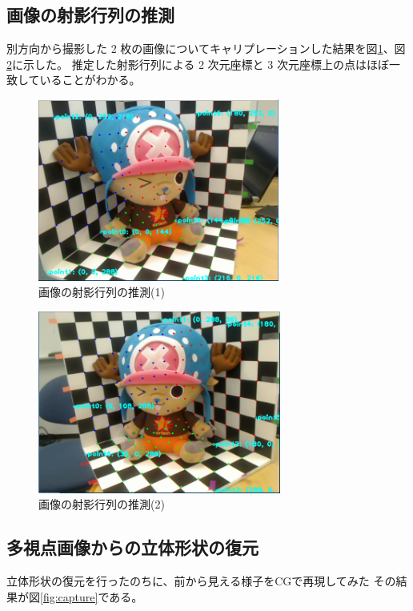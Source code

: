 \documentclass[11pt,a4j]{jsarticle}
\makeatletter
\newcommand{\figcaption}[1]{\def\@captype{figure}\caption{#1}}
\makeatother
\begin{document}
\subsection{画像の射影行列の推測}
\label{sub:result_syaei}

別方向から撮影した 2 枚の画像についてキャリプレーションした結果を図\ref{fig:input0}、図\ref{fig:input1}に示した。
推定した射影行列による 2 次元座標と 3 次元座標上の点はほぼ一致していることがわかる。

\begin{figure}[H]
  \centering
  \includegraphics[height=60mm,bb=0 0 642 486]{image/input0.png}
  \figcaption{画像の射影行列の推測(1)}
  \label{fig:input0}
\end{figure}

\begin{figure}[H]
  \centering
  \includegraphics[height=60mm,bb=0 0 644 483]{image/input1.png}
  \figcaption{画像の射影行列の推測(2)}
  \label{fig:input1}
\end{figure}


\subsection{多視点画像からの立体形状の復元}
\label{sub:result_multimage}

立体形状の復元を行ったのちに、前から見える様子をCGで再現してみた
その結果が図\ref{fig:capture}である。
\end{document}
